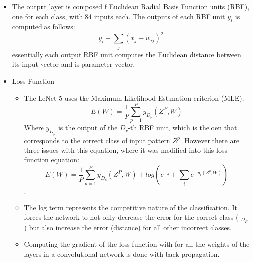 \documentclass{article}
\begin{document}
\begin{itemize}
            \[y = w^Tx + b\]
        Then a that sum ($y$) is then input for a sigmoid function to produce the state for one of units in the next layer. For the CNN is squashing function is a scaled hyperbolic tangent:
            \[f(a) = Atanh(Sa)\]
        where A is the amplitude of the function and S determines its slope at the origin. A is chosen to be 1.7159.
        \item The output layer is composed f Euclidean Radial Basis Function units (RBF), one for each class, with 84 inputs each. The outputs of each RBF unit $y_i$ is computed as follows:
            \[y_i - \sum_j (x_j - w_{ij})^2 \]
        essentially each output RBF unit computes the Euclidean distance between its input vector and is parameter vector.
        \item Loss Function
            \begin{itemize}
                \item The LeNet-5 uses the Maximum Likelihood Estimation criterion (MLE).
                    \[E(W) = \frac{1}{P} \sum_{p=1}^{P} y_{D_p}(Z^P, W)\]
                Where $y_{D_p}$ is the output of the $D_p$-th RBF unit, which is the oen that corresponds to the correct class of input pattern $Z^p$. However there are three issues with this equation, where it was modified into this loss function equation:
                    \[E(W) = \frac{1}{P} \sum_{p=1}^{P} y_{D_p}(Z^P, W) + log(e^{-j} + \sum_i e^{-y_i(Z^p, W)})\].
                \item The log term represents the competitive nature of the classification. It forces the network to not only decrease the error for the correct class ( $_{D_P}$) but also increase the error (distance) for all other incorrect classes.
                \item Computing the gradient of the loss function with for all the weights of the layers in a convolutional network is done with back-propagation.
            \end{itemize}
    \end{itemize}
\end{document}
